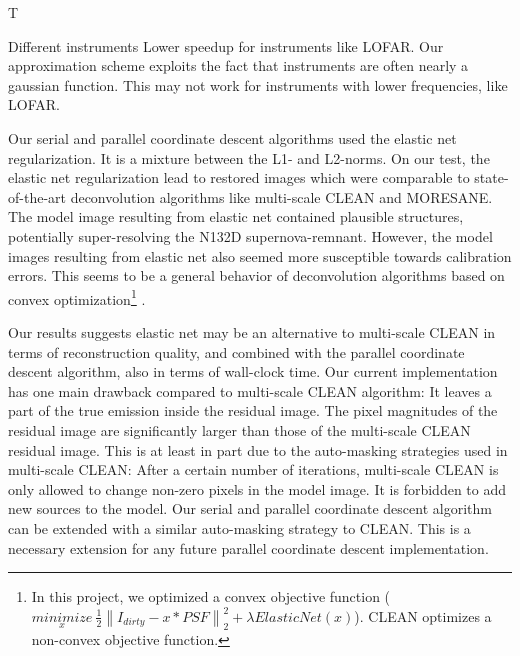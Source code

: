 T

Different instruments
Lower speedup for instruments like LOFAR. 
Our approximation scheme exploits the fact that instruments are often nearly a gaussian function. This may not work for instruments with lower frequencies, like LOFAR.



Our serial and parallel coordinate descent algorithms used the elastic net regularization. It is a mixture between the L1- and L2-norms. On our test, the elastic net regularization lead to restored images which were comparable to state-of-the-art deconvolution algorithms like multi-scale CLEAN and MORESANE. The model image resulting from elastic net contained plausible structures, potentially super-resolving the N132D supernova-remnant. However, the model images resulting from elastic net also seemed more susceptible towards calibration errors. This seems to be a general behavior of deconvolution algorithms based on convex optimization\footnote{In this project, we optimized a convex objective function ($\underset{x}{minimize} \: \frac{1}{2} \left \| I_{dirty} - x * PSF \right \|_2^2 + \lambda ElasticNet(x)$). CLEAN optimizes a non-convex objective function.} \cite{offringa2017optimized}.

Our results suggests elastic net may be an alternative to multi-scale CLEAN in terms of reconstruction quality, and combined with the parallel coordinate descent algorithm, also in terms of wall-clock time. Our current implementation has one main drawback compared to multi-scale CLEAN algorithm: It leaves  a part of the true emission inside the residual image. The pixel magnitudes of the residual image are significantly larger than those of the multi-scale CLEAN residual image. This is at least in part due to the auto-masking strategies used in multi-scale CLEAN: After a certain number of iterations, multi-scale CLEAN is only allowed to change non-zero pixels in the model image. It is forbidden to add new sources to the model. Our serial and parallel coordinate descent algorithm can be extended with a similar auto-masking strategy to CLEAN. This is a necessary extension for any future parallel coordinate descent implementation.

